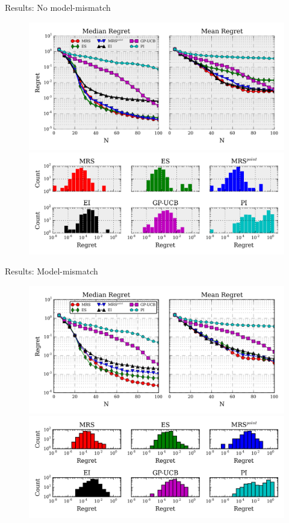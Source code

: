 \documentclass[11pt]{beamer}
\begin{document}
\begin{frame}{Results: No model-mismatch}
\begin{figure}
\centering
\includegraphics[width=.7\columnwidth]{../pics/empirical_comparison} \\
\includegraphics[width=.7\columnwidth]{../pics/hist}
\end{figure}
\end{frame}



\begin{frame}{Results: Model-mismatch}
\begin{figure}
\centering
\includegraphics[width=.7\textwidth]{../pics/empirical_comparison_mm} \\
\includegraphics[width=.7\textwidth]{../pics/hist_mm}
\end{figure}
\end{frame}
\end{document}
